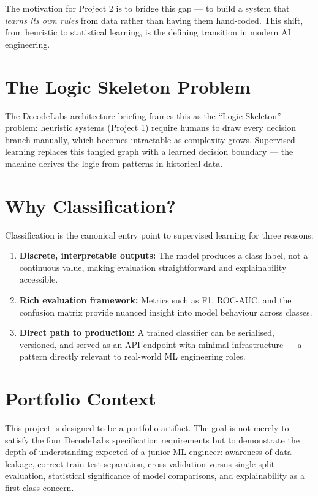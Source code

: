 \documentclass[12pt, a4paper]{report}
\begin{document}
The motivation for Project 2 is to bridge this gap — to build a system that \textit{learns
its own rules} from data rather than having them hand-coded. This shift, from heuristic
to statistical learning, is the defining transition in modern AI engineering.

\section{The Logic Skeleton Problem}

The DecodeLabs architecture briefing frames this as the ``Logic Skeleton'' problem:
heuristic systems (Project 1) require humans to draw every decision branch manually, which
becomes intractable as complexity grows. Supervised learning replaces this tangled graph
with a learned decision boundary — the machine derives the logic from patterns in
historical data.

\section{Why Classification?}

Classification is the canonical entry point to supervised learning for three reasons:

\begin{enumerate}[itemsep=4pt]
  \item \textbf{Discrete, interpretable outputs:} The model produces a class label, not a
        continuous value, making evaluation straightforward and explainability accessible.
  \item \textbf{Rich evaluation framework:} Metrics such as F1, ROC-AUC, and the
        confusion matrix provide nuanced insight into model behaviour across classes.
  \item \textbf{Direct path to production:} A trained classifier can be serialised,
        versioned, and served as an API endpoint with minimal infrastructure — a pattern
        directly relevant to real-world ML engineering roles.
\end{enumerate}

\section{Portfolio Context}

This project is designed to be a portfolio artifact. The goal is not merely to satisfy
the four DecodeLabs specification requirements but to demonstrate the depth of
understanding expected of a junior ML engineer: awareness of data leakage, correct
train-test separation, cross-validation versus single-split evaluation, statistical
significance of model comparisons, and explainability as a first-class concern.
\end{document}
